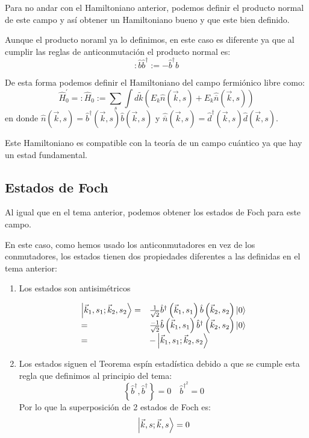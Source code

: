 Para no andar con el Hamiltoniano anterior, podemos definir el producto normal de este campo y así obtener un Hamiltoniano bueno y que este bien definido.

\begin{definition}

  Aunque el producto noraml ya lo definimos, en este caso es diferente ya que al cumplir las reglas de anticonmutación el producto normal es:
  $$
: \hat{b} \hat{b}^{\dagger}:=-\hat{b}^{\dagger} \hat{b}
$$
\end{definition}

De esta forma podemos definir el Hamiltoniano del campo fermiónico libre como:
$$
\hat{H}_0^{\prime}=: \hat{H}_0:=\sum_s \int d \tilde{k}\left(E_k \hat{n}(\vec{k}, s)+E_k \hat{\overline{n}}(\vec{k}, s)\right)
$$
en donde $\hat{n}(\vec{k}, s)=\hat{b}^{\dagger}(\vec{k}, s) \hat{b}(\vec{k}, s)$ y $\hat{\overline{n}}(\vec{k}, s)=\hat{d}^{\dagger}(\vec{k}, s) \hat{d}(\vec{k}, s)$. 

Este Hamiltoniano es compatible con la teoría de un campo cuántico ya que hay un estad fundamental.

\subsection{Estados de Foch}

Al igual que en el tema anterior, podemos obtener los estados de Foch para este campo. 

En este caso, como hemos usado los anticonmutadores en vez de los conmutadores, los estados tienen dos propiedades diferentes a las definidas en el tema anterior:
\begin{enumerate}
  \item Los estados son antisimétricos
  
  $$\begin{array}{ll}
    \ket{\vec{k}_1, s_1 ; \vec{k}_2, s_2}=&\frac{1}{\sqrt{2}} \hat{b}^{\dagger}\left(\vec{k}_1, s_1\right) \hat{b}\left(\vec{k}_2, s_2\right)\ket{0} \\
    =&\frac{-1}{\sqrt{2}}\hat{b}\left(\vec{k}_1, s_1\right) \hat{b}^{\dagger}\left(\vec{k}_2, s_2\right)\ket{0} \\
    =&-\ket{\vec{k}_1, s_1 ; \vec{k}_2, s_2}
  \end{array}$$

  \item Los estados siguen el Teorema espín estadística debido a que se cumple esta regla que definimos al principio del tema: 
  $$
\left\{\hat{b}^{\dagger}, \hat{b}^{\dagger}\right\}=0 \quad \hat{b}^{\dagger^{2}}=0
$$
Por lo que la superposición de 2 estados de Foch es:
$$
\ket{\vec{k},s; \vec{k},s}=0
$$
\end{enumerate}


